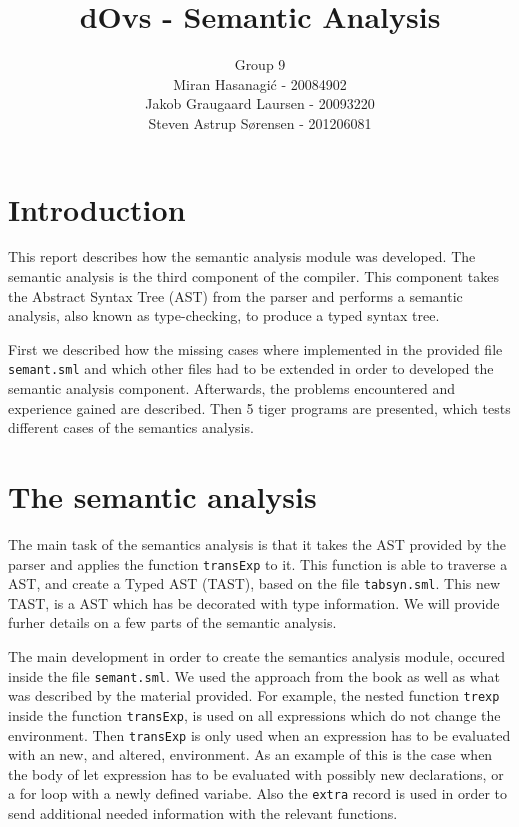 \documentclass{article}
\title{dOvs - Semantic Analysis}
\author{
  Group 9 \\
  Miran Hasanagi\'{c} - 20084902 \\
  Jakob Graugaard Laursen - 20093220\\
  Steven Astrup S\o rensen - 201206081
}
\begin{document}
\maketitle

\section{Introduction}
This report describes how the semantic analysis module was developed. The semantic analysis is the third component of the compiler. This component takes the Abstract Syntax Tree (AST) from the parser and performs a semantic analysis, also known as type-checking, to produce a typed syntax tree. 

First we described how the missing cases where implemented in the provided file \texttt{semant.sml} and which other files had to be extended in order to developed the semantic analysis component. Afterwards, the problems encountered and experience gained are described. Then 5 tiger programs are presented, which tests different cases of the semantics analysis.

\section{The semantic analysis}
The main task of the semantics analysis is that it takes the AST provided by the parser and applies the function \texttt{transExp} to it. This function is able to traverse a AST, and create a Typed AST (TAST), based on the file \texttt{tabsyn.sml}. This new TAST, is a AST which has be decorated with type information. We will provide furher details
on a few parts of the semantic analysis.

The main development in order to create the semantics analysis module, occured inside the file \texttt{semant.sml}. We used the approach from the book as well as 
what was described by the material provided. For example, the nested function \texttt{trexp} inside the function \texttt{transExp}, is used on all expressions which do not change the environment. Then \texttt{transExp} is only used when an expression has to be evaluated with an new, and altered, environment. As an example of this is the case when the body of let expression has to be evaluated with possibly new declarations, or a for loop with a newly defined variabe. Also the \texttt{extra} record is used in order to send additional needed information with the relevant functions.
\end{document}
